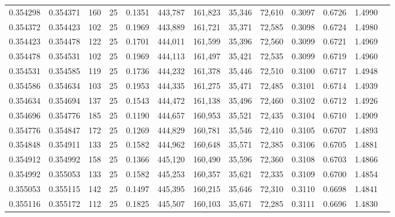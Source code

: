\begin{tabular}{rrrrrrrrrrrrr}
0.354298 & 0.354371 &   160 &  25 &                                     0.1351 & 443,787 & 161,823 &  35,346 &  72,610 & 0.3097 & 0.6726 & 1.4990 \\
0.354372 & 0.354423 &   102 &  25 &                                     0.1969 & 443,889 & 161,721 &  35,371 &  72,585 & 0.3098 & 0.6724 & 1.4980 \\
0.354423 & 0.354478 &   122 &  25 &                                     0.1701 & 444,011 & 161,599 &  35,396 &  72,560 & 0.3099 & 0.6721 & 1.4969 \\
0.354478 & 0.354531 &   102 &  25 &                                     0.1969 & 444,113 & 161,497 &  35,421 &  72,535 & 0.3099 & 0.6719 & 1.4960 \\
0.354531 & 0.354585 &   119 &  25 &                                     0.1736 & 444,232 & 161,378 &  35,446 &  72,510 & 0.3100 & 0.6717 & 1.4948 \\
0.354586 & 0.354634 &   103 &  25 &                                     0.1953 & 444,335 & 161,275 &  35,471 &  72,485 & 0.3101 & 0.6714 & 1.4939 \\
0.354634 & 0.354694 &   137 &  25 &                                     0.1543 & 444,472 & 161,138 &  35,496 &  72,460 & 0.3102 & 0.6712 & 1.4926 \\
0.354696 & 0.354776 &   185 &  25 &                                     0.1190 & 444,657 & 160,953 &  35,521 &  72,435 & 0.3104 & 0.6710 & 1.4909 \\
0.354776 & 0.354847 &   172 &  25 &                                     0.1269 & 444,829 & 160,781 &  35,546 &  72,410 & 0.3105 & 0.6707 & 1.4893 \\
0.354848 & 0.354911 &   133 &  25 &                                     0.1582 & 444,962 & 160,648 &  35,571 &  72,385 & 0.3106 & 0.6705 & 1.4881 \\
0.354912 & 0.354992 &   158 &  25 &                                     0.1366 & 445,120 & 160,490 &  35,596 &  72,360 & 0.3108 & 0.6703 & 1.4866 \\
0.354992 & 0.355053 &   133 &  25 &                                     0.1582 & 445,253 & 160,357 &  35,621 &  72,335 & 0.3109 & 0.6700 & 1.4854 \\
0.355053 & 0.355115 &   142 &  25 &                                     0.1497 & 445,395 & 160,215 &  35,646 &  72,310 & 0.3110 & 0.6698 & 1.4841 \\
0.355116 & 0.355172 &   112 &  25 &                                     0.1825 & 445,507 & 160,103 &  35,671 &  72,285 & 0.3111 & 0.6696 & 1.4830 \\

\end{tabular}

